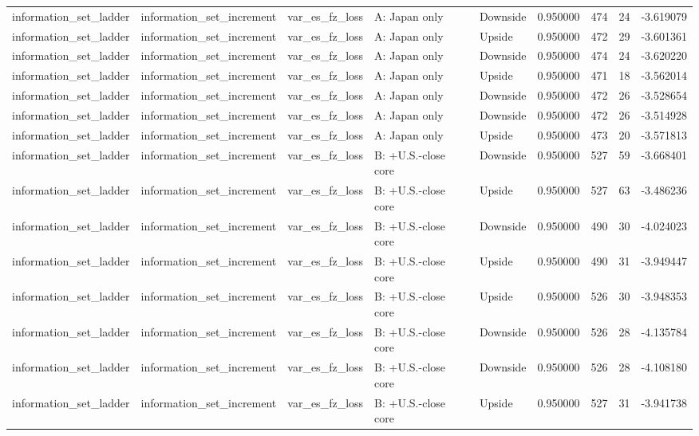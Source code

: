 \begin{tabular}{lllllrrr}
information\_set\_ladder & information\_set\_increment & var\_es\_fz\_loss & A: Japan only & Downside & 0.950000 & 474 & 24 & -3.619079 \\
information\_set\_ladder & information\_set\_increment & var\_es\_fz\_loss & A: Japan only & Upside & 0.950000 & 472 & 29 & -3.601361 \\
information\_set\_ladder & information\_set\_increment & var\_es\_fz\_loss & A: Japan only & Downside & 0.950000 & 474 & 24 & -3.620220 \\
information\_set\_ladder & information\_set\_increment & var\_es\_fz\_loss & A: Japan only & Upside & 0.950000 & 471 & 18 & -3.562014 \\
information\_set\_ladder & information\_set\_increment & var\_es\_fz\_loss & A: Japan only & Downside & 0.950000 & 472 & 26 & -3.528654 \\
information\_set\_ladder & information\_set\_increment & var\_es\_fz\_loss & A: Japan only & Downside & 0.950000 & 472 & 26 & -3.514928 \\
information\_set\_ladder & information\_set\_increment & var\_es\_fz\_loss & A: Japan only & Upside & 0.950000 & 473 & 20 & -3.571813 \\
information\_set\_ladder & information\_set\_increment & var\_es\_fz\_loss & B: +U.S.-close core & Downside & 0.950000 & 527 & 59 & -3.668401 \\
information\_set\_ladder & information\_set\_increment & var\_es\_fz\_loss & B: +U.S.-close core & Upside & 0.950000 & 527 & 63 & -3.486236 \\
information\_set\_ladder & information\_set\_increment & var\_es\_fz\_loss & B: +U.S.-close core & Downside & 0.950000 & 490 & 30 & -4.024023 \\
information\_set\_ladder & information\_set\_increment & var\_es\_fz\_loss & B: +U.S.-close core & Upside & 0.950000 & 490 & 31 & -3.949447 \\
information\_set\_ladder & information\_set\_increment & var\_es\_fz\_loss & B: +U.S.-close core & Upside & 0.950000 & 526 & 30 & -3.948353 \\
information\_set\_ladder & information\_set\_increment & var\_es\_fz\_loss & B: +U.S.-close core & Downside & 0.950000 & 526 & 28 & -4.135784 \\
information\_set\_ladder & information\_set\_increment & var\_es\_fz\_loss & B: +U.S.-close core & Downside & 0.950000 & 526 & 28 & -4.108180 \\
information\_set\_ladder & information\_set\_increment & var\_es\_fz\_loss & B: +U.S.-close core & Upside & 0.950000 & 527 & 31 & -3.941738 \\

\end{tabular}
